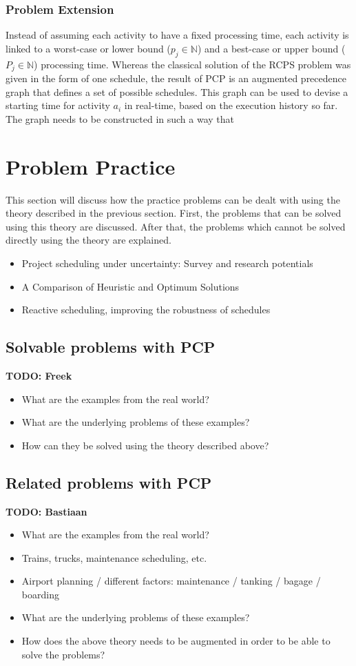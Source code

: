 \documentclass{article}
\newcommand{\TODO}[1]{{\color{red}\textbf{TODO: #1}}}
\begin{document}
\subsubsection{Problem Extension}
Instead of assuming each activity to have a fixed processing time, each activity is linked to a worst-case or lower bound ($p_{j} \in \mathbb{N}$) and a best-case or upper bound ($P_{j} \in \mathbb{N}$) processing time. Whereas the classical solution of the RCPS problem was given in the form of one schedule, the result of PCP is an augmented precedence graph that defines a set of possible schedules. This graph can be used to devise a starting time for activity $a_i$ in real-time, based on the execution history so far. The graph needs to be constructed in such a way that 


\section{Problem Practice}
This section will discuss how the practice problems can be dealt with using the theory described in the previous section. First, the problems that can be solved using this theory are discussed. After that, the problems which cannot be solved directly using the theory are explained.\\

\begin{itemize}
\item Project scheduling under uncertainty: Survey
and research potentials
\item A Comparison of Heuristic and Optimum Solutions
\item Reactive scheduling, improving the robustness of schedules
\end{itemize}

\subsection{Solvable problems with PCP}
\TODO{Freek}
\begin{itemize}
\item What are the examples from the real world? 
\item What are the underlying problems of these examples?
\item How can they be solved using the theory described above?
\end{itemize}

\subsection{Related problems with PCP}
\TODO{Bastiaan}
\begin{itemize}
\item What are the examples from the real world?
\item Trains, trucks, maintenance scheduling, etc.
\item Airport planning / different factors: maintenance / tanking / bagage / boarding
\item What are the underlying problems of these examples?
\item How does the above theory needs to be augmented in order to be able to solve the problems?
\end{itemize}
\end{document}
